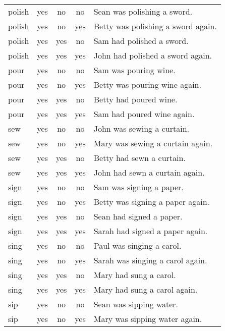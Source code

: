 \begin{longtable}{l|ccc|p{5cm}}
polish    & yes  & no   & no   & Sean was polishing a sword.                  \\
polish    & yes  & no   & yes  & Betty was polishing a sword again.           \\
polish    & yes  & yes  & no   & Sam had polished a sword.                    \\
polish    & yes  & yes  & yes  & John had polished a sword again.             \\
pour      & yes  & no   & no   & Sam was pouring wine.                        \\
pour      & yes  & no   & yes  & Betty was pouring wine again.                \\
pour      & yes  & yes  & no   & Betty had poured wine.                       \\
pour      & yes  & yes  & yes  & Sam had poured wine again.                   \\
sew       & yes  & no   & no   & John was sewing a curtain.                   \\
sew       & yes  & no   & yes  & Mary was sewing a curtain again.             \\
sew       & yes  & yes  & no   & Betty had sewn a curtain.                    \\
sew       & yes  & yes  & yes  & John had sewn a curtain again.               \\
sign      & yes  & no   & no   & Sam was signing a paper.                     \\
sign      & yes  & no   & yes  & Betty was signing a paper again.             \\
sign      & yes  & yes  & no   & Sean had signed a paper.                     \\
sign      & yes  & yes  & yes  & Sarah had signed a paper again.              \\
sing      & yes  & no   & no   & Paul was singing a carol.                    \\
sing      & yes  & no   & yes  & Sarah was singing a carol again.             \\
sing      & yes  & yes  & no   & Mary had sung a carol.                       \\
sing      & yes  & yes  & yes  & Mary had sung a carol again.                 \\
sip       & yes  & no   & no   & Sean was sipping water.                      \\
sip       & yes  & no   & yes  & Mary was sipping water again.                \\

\end{longtable}
